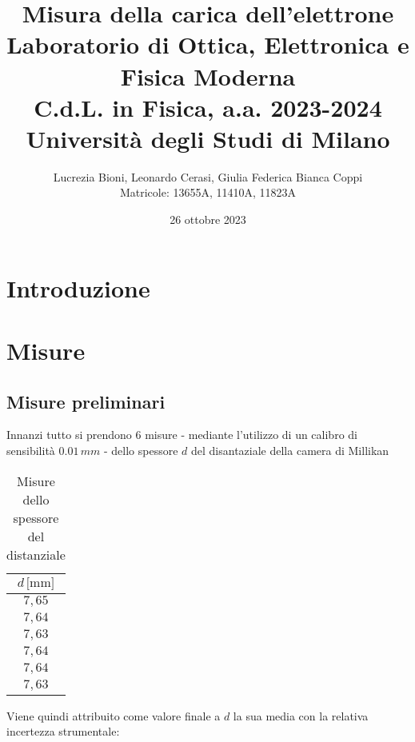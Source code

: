 \documentclass[]{article}
\title{%
    \Huge Misura della carica dell'elettrone \\
    \Large Laboratorio di Ottica, Elettronica e Fisica Moderna \\ C.d.L. in Fisica, a.a. 2023-2024 \\ Università degli Studi di Milano}
\author{\LARGE Lucrezia Bioni, Leonardo Cerasi, Giulia Federica Bianca Coppi \\ Matricole: 13655A, 11410A, 11823A}
\date{26 ottobre 2023}
\let\oldsection\section%
\renewcommand{\section}{%
	\renewcommand{\theequation}{\thesection.\arabic{equation}}%
	\oldsection}%
\let\oldsubsection\subsection%
\renewcommand{\subsection}{%
	\renewcommand{\theequation}{\thesubsection.\arabic{equation}}%
	\oldsubsection}%
\begin{document}
    \maketitle

    \section{Introduzione}

    \section{Misure}

    \subsection{Misure preliminari}
    \label{par:misure-preliminari}

    Innanzi tutto si prendono 6 misure - mediante l'utilizzo di un calibro di sensibilità $ 0.01\, mm $ - dello spessore $ d $ del disantaziale della camera di Millikan

    \begin{table}[H]
        \centering
    
        \begin{tabular}{||c||}
            \hline
            $d\, \text{[mm]} $ \\
            \hline\hline
    
            $ 7,65 $ \\\hline
            $ 7,64 $ \\\hline
            $ 7,63 $ \\\hline
            $ 7,64 $ \\\hline
            $ 7,64 $ \\\hline
            $ 7,63 $ \\\hline

        
        \end{tabular}
        \caption{Misure dello spessore del distanziale}
        \label{distanziale}
    \end{table}

    Viene quindi attribuito come valore finale a $ d $ la sua media con la relativa incertezza strumentale:
\end{document}
